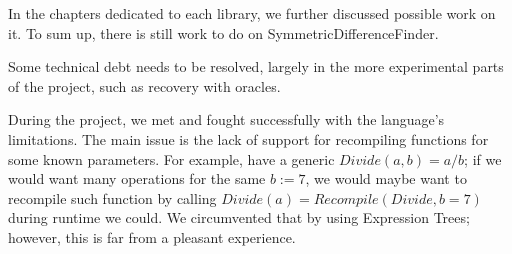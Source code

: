 In the chapters dedicated to each library, we further discussed possible work on it. To sum up, there is still work to do on SymmetricDifferenceFinder. 

Some technical debt needs to be resolved, largely in the more experimental parts of the project, such as recovery with oracles.

During the project, we met and fought successfully with the language's limitations. The main issue is the lack of support for recompiling functions for some known parameters. For example, have a generic $Divide(a,b) = a / b$; if we would want many operations for the same $b:=7$, we would maybe want to recompile such function by calling $Divide(a) = Recompile(Divide, b = 7)$ during runtime we could. We circumvented that by using Expression Trees; however, this is far from a pleasant experience. 

